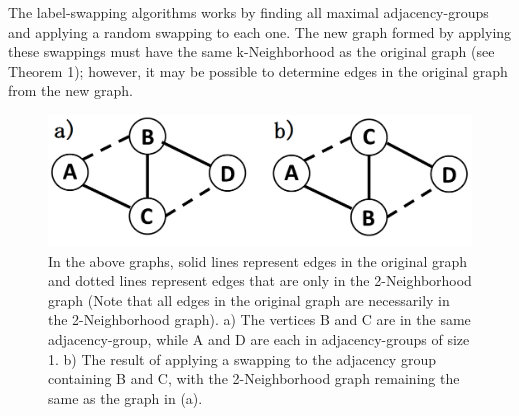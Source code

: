 \documentclass[11pt]{article}
\begin{document}
\indent The label-swapping algorithms works by finding all maximal adjacency-groups and applying a random swapping to each one. The new graph formed by applying these swappings must have the same k-Neighborhood as the original graph (see Theorem 1); however, it may be possible to determine edges in the original graph from the new graph.
\\

\begin{figure}[htb]
\centering
\includegraphics[scale=0.3 ]{Sample-Graph.png}
\caption{In the above graphs, solid lines represent edges in the original graph and dotted lines represent edges that are only in the 2-Neighborhood graph (Note that all edges in the original graph are necessarily in the 2-Neighborhood graph). a)  The vertices B and C are in the same adjacency-group, while A and D are each in adjacency-groups of size 1. b) The result of applying a swapping to the adjacency group containing B and C, with the 2-Neighborhood graph remaining the same as the graph in (a).}
\label{fig:sample graph}
\end{figure}
\end{document}

